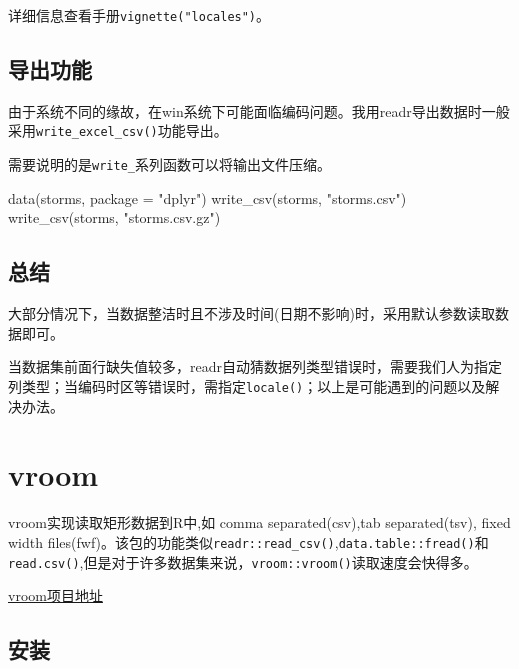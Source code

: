 \documentclass[
]{book}
\newenvironment{Shaded}{\begin{snugshade}}{\end{snugshade}}
\newcommand{\AttributeTok}[1]{\textcolor[rgb]{0.77,0.63,0.00}{#1}}
\newcommand{\FunctionTok}[1]{\textcolor[rgb]{0.00,0.00,0.00}{#1}}
\newcommand{\NormalTok}[1]{#1}
\newcommand{\StringTok}[1]{\textcolor[rgb]{0.31,0.60,0.02}{#1}}
\begin{document}
详细信息查看手册\texttt{vignette("locales")}。

\hypertarget{readr:write-function}{%
\subsection{导出功能}\label{readr:write-function}}

由于系统不同的缘故，在win系统下可能面临编码问题。我用readr导出数据时一般采用\texttt{write\_excel\_csv()}功能导出。

需要说明的是\texttt{write\_}系列函数可以将输出文件压缩。

\begin{Shaded}
\begin{Highlighting}[]
\FunctionTok{data}\NormalTok{(storms, }\AttributeTok{package =} \StringTok{"dplyr"}\NormalTok{)}
\FunctionTok{write\_csv}\NormalTok{(storms, }\StringTok{"storms.csv"}\NormalTok{)}
\FunctionTok{write\_csv}\NormalTok{(storms, }\StringTok{"storms.csv.gz"}\NormalTok{)}
\end{Highlighting}
\end{Shaded}

\hypertarget{ux603bux7ed3-1}{%
\subsection{总结}\label{ux603bux7ed3-1}}

大部分情况下，当数据整洁时且不涉及时间(日期不影响)时，采用默认参数读取数据即可。

当数据集前面行缺失值较多，readr自动猜数据列类型错误时，需要我们人为指定列类型；当编码时区等错误时，需指定\texttt{locale()}；以上是可能遇到的问题以及解决办法。

\hypertarget{data:vroom}{%
\section{vroom}\label{data:vroom}}

vroom实现读取矩形数据到R中,如 comma separated(csv),tab separated(tsv), fixed width files(fwf)。该包的功能类似\texttt{readr::read\_csv()},\texttt{data.table::fread()}和\texttt{read.csv()},但是对于许多数据集来说，\texttt{vroom::vroom()}读取速度会快得多。

\href{https://vroom.r-lib.org/index.html}{vroom项目地址}

\hypertarget{ux5b89ux88c5}{%
\subsection{安装}\label{ux5b89ux88c5}}
\end{document}
